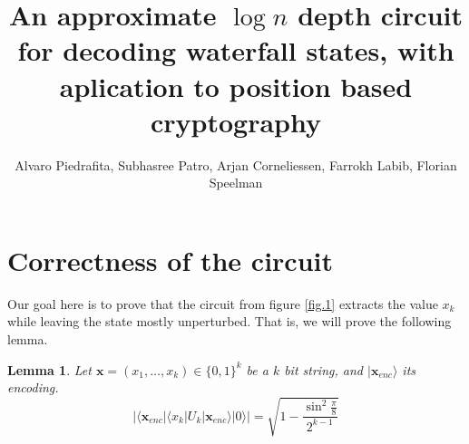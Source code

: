 \documentclass{article}
\newtheorem{lemma}[theorem]{Lemma}
\theoremstyle{definition}
\newcommand{\ket}[1]{|#1\rangle}
\newcommand{\bra}[1]{\langle#1|}
\begin{document}
\title{\large {\bf An approximate $\log n$ depth circuit for decoding waterfall states, with aplication to position based cryptography}}
\author{Alvaro Piedrafita, Subhasree Patro, Arjan Corneliessen, Farrokh Labib, Florian Speelman}
\maketitle
\section{Correctness of the circuit}

 Our goal here is to prove that the circuit from figure \ref{fig.1} extracts the value $x_k$ while leaving the state mostly unperturbed. That is, we will prove the following lemma.

\begin{lemma}
Let $\textbf{x}=(x_1,\dots,x_k)\in\{0,1\}^k$ be a $k$ bit string, and $\ket{\textbf{x}_{enc}}$ its encoding.
\begin{equation}
|\bra{\textbf{x}_{enc}}\bra{x_k}U_k\ket{\textbf{x}_{enc}}\ket{0}|= \sqrt{1-\frac{\sin^2\frac{\pi}{8}}{2^{k-1}}}
\end{equation}
\end{lemma}
\end{document}
